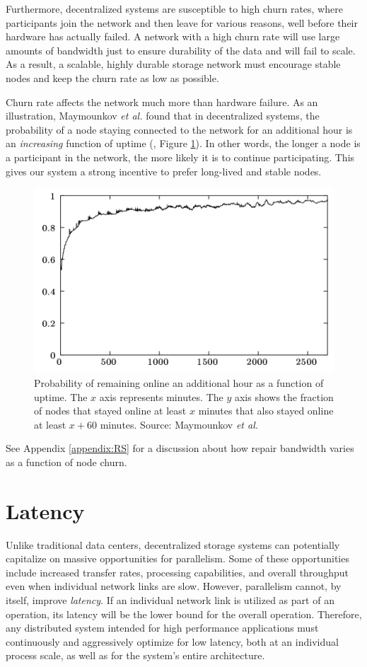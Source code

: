 \documentclass[11pt,fleqn,openany]{book}
\begin{document}
Furthermore, decentralized systems are susceptible to high churn rates, where
participants join the network and then leave for various reasons, well
before their hardware has actually failed. A network with a high churn rate will
use large amounts of bandwidth just to ensure durability of the data and
will fail to scale. As a result, a scalable, highly durable storage
network must encourage stable nodes and keep the churn rate as low as possible.

Churn rate affects the network much more than hardware failure. As an
illustration, Maymounkov {\em et al.} found that in
decentralized systems, the probability of a node staying connected to the
network for an additional hour is an {\em increasing}
function of uptime (\cite{kad}, Figure \ref{fig:kad-uptime}).
In other words, the longer a node is a
participant in the network, the more likely it is to continue
participating. This gives our system a strong incentive to prefer long-lived
and stable nodes.

\begin{figure}
\centering
\includegraphics[width=.6\textwidth]{images/uptime.png}
\caption{Probability of remaining online an additional hour as a function of
uptime.
The $x$ axis represents minutes. The $y$ axis shows the fraction of nodes
that stayed online at least $x$ minutes that also stayed online at least
$x+60$ minutes. Source: Maymounkov {\em et al.} \cite{kad}}
\label{fig:kad-uptime}
\end{figure}

See Appendix \ref{appendix:RS} for a discussion about how repair bandwidth
varies as a function of node churn.

\section{Latency}

Unlike traditional data centers,
decentralized storage systems can potentially capitalize on
massive opportunities for parallelism.
Some of these opportunities include increased transfer rates, processing
capabilities, and overall throughput even when individual
network links are slow. However, parallelism cannot, by itself, improve {\em
latency}. If an individual network link is utilized as part of an operation,
its latency will be the lower bound for the overall operation.
Therefore, any distributed system
intended for high performance applications must continuously and aggressively
optimize for low latency, both at an individual process scale, as well as for
the system's entire architecture.
\end{document}
